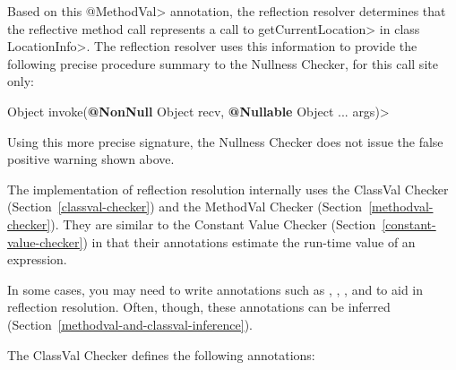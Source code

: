 Based on this \<@MethodVal> annotation, the reflection resolver determines that
the reflective method call represents a call to \<getCurrentLocation> in class
\<LocationInfo>.
The reflection resolver uses this information to provide the
following precise procedure summary to the Nullness Checker, for this
call site only:

\quad {} Object invoke({\bfseries @NonNull} Object recv, {\bfseries @Nullable} Object ... args)>

Using this more precise signature, the Nullness Checker does not issue the false positive warning shown above.



The implementation of reflection resolution internally uses the ClassVal
Checker (Section~\ref{classval-checker}) and the MethodVal Checker
(Section~\ref{methodval-checker}).  They are similar to the Constant
Value Checker (Section~\ref{constant-value-checker}) in that their
annotations estimate the run-time value of an expression.

In some cases, you may need to write annotations such as
,
,
, and
 to aid in reflection
resolution.
Often, though, these annotations can be inferred
(Section~\ref{methodval-and-classval-inference}).



The ClassVal Checker defines the following annotations:

